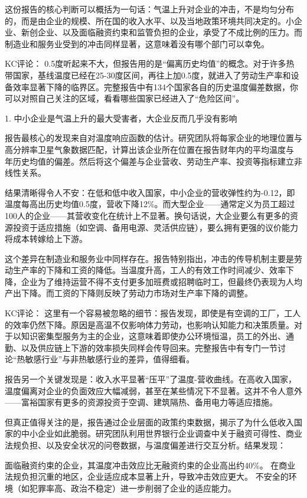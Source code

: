 \documentclass[11pt]{ctexart}
\begin{document}
这份报告的核心判断可以概括为一句话：气温上升对企业的冲击，不是均匀分布的，而是由企业的规模、所在国的收入水平、以及当地政策环境共同决定的。小企业、新创企业、以及面临融资约束和监管负担的企业，承受了不成比例的压力。而制造业和服务业受到的冲击同样显著，这意味着没有哪个部门可以幸免。

KC评论： 0.5度听起来不大，但报告用的是“偏离历史均值”的概念。对于许多热带国家，基线温度已经在25-30度区间，再往上加0.5度，就进入了劳动生产率和设备效率显著下降的临界区。完整报告中有134个国家各自的历史温度偏差数据，你可以对照自己关注的区域，看看哪些国家已经进入了“危险区间”。

1. 中小企业是气温上升的最大受害者，大企业反而几乎没有影响

报告最核心的发现来自对温度响应函数的估计。研究团队将每家企业的地理位置与高分辨率卫星气象数据匹配，计算出该企业所在位置在报告财年内的平均温度与 年历史均值的偏差。然后将这个偏差与企业营收、劳动生产率、投资等指标建立非线性关系。

结果清晰得令人不安：在低和低中收入国家，中小企业的营收弹性约为-0.12，即温度每高出历史均值0.5度，营收下降12\%。而大型企业——通常定义为员工超过100人的企业——其营收变化在统计上不显著。换句话说，大企业要么有更多的资源投资于适应措施（如空调、备用电源、灵活供应链），要么拥有更强的议价能力将成本转嫁给上下游。

这个差异在制造业和服务业中同样存在。报告特别指出，冲击的传导机制主要是劳动生产率的下降和工资的降低。当温度升高，工人的有效工作时间减少、效率下降，企业为了维持运营不得不支付更多加班费或招聘临时工，但最终仍表现为人均产出下降。而工资的下降则反映了劳动力市场对生产率下降的调整。

KC评论： 这里有一个容易被忽略的细节：报告发现，即使是有空调的工厂，工人的效率仍然下降。原因是高温不仅影响体力劳动，也影响认知能力和决策质量。对于以知识密集型服务为主的企业，这意味着即使办公环境恒温，员工的外出、通勤、以及供应链上下游的效率损失同样会传导回来。完整报告中有专门一节讨论“热敏感行业”与非热敏感行业的差异，值得细看。

报告另一个关键发现是：收入水平显著“压平”了温度-营收曲线。在高收入国家，温度偏离对企业的负面效应大幅减弱，甚至在某些情况下不显著。这并不令人意外——富裕国家有更多的资源投资于空调、建筑隔热、备用电力等适应措施。

但真正值得关注的是，报告通过企业层面的政策约束数据，揭示了为什么低收入国家的中小企业如此脆弱。研究团队利用世界银行企业调查中关于融资可得性、商业法规负担、以及安全状况的问卷数据，与温度偏差进行交互分析。结果发现：

面临融资约束的企业，其温度冲击效应比无融资约束的企业高出约40\%。 在商业法规负担沉重的地区，企业适应成本显著上升，导致冲击效应更大。 不安全的环境（如犯罪率高、政治不稳定）进一步削弱了企业的适应能力。
\end{document}
